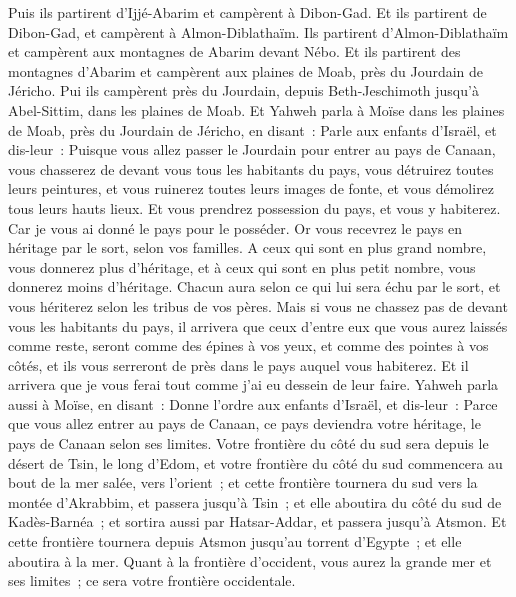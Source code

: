 \begin{multicols}{2}
Puis ils partirent d'Ijjé-Abarim et campèrent à Dibon-Gad.
Et ils partirent de Dibon-Gad, et campèrent à Almon-Diblathaïm.
Ils partirent d'Almon-Diblathaïm et campèrent aux montagnes de Abarim devant Nébo.
Et ils partirent des montagnes d'Abarim et campèrent aux plaines de Moab, près du Jourdain de Jéricho.
Pui ils campèrent près du Jourdain, depuis Beth-Jeschimoth jusqu'à Abel-Sittim, dans les plaines de Moab.
Et Yahweh parla à Moïse dans les plaines de Moab, près du Jourdain de Jéricho, en disant~:
Parle aux enfants d'Israël, et dis-leur~: Puisque vous allez passer le Jourdain pour entrer au pays de Canaan,
vous chasserez de devant vous tous les habitants du pays, vous détruirez toutes leurs peintures, et vous ruinerez toutes leurs images de fonte, et vous démolirez tous leurs hauts lieux.
Et vous prendrez possession du pays, et vous y habiterez. Car je vous ai donné le pays pour le posséder.
Or vous recevrez le pays en héritage par le sort, selon vos familles. A ceux qui sont en plus grand nombre, vous donnerez plus d'héritage, et à ceux qui sont en plus petit nombre, vous donnerez moins d'héritage. Chacun aura selon ce qui lui sera échu par le sort, et vous hériterez selon les tribus de vos pères.
Mais si vous ne chassez pas de devant vous les habitants du pays, il arrivera que ceux d'entre eux que vous aurez laissés comme reste, seront comme des épines à vos yeux, et comme des pointes à vos côtés, et ils vous serreront de près dans le pays auquel vous habiterez.
Et il arrivera que je vous ferai tout comme j'ai eu dessein de leur faire.
\VerseOne{}Yahweh parla aussi à Moïse, en disant~:
Donne l'ordre aux enfants d'Israël, et dis-leur~: Parce que vous allez entrer au pays de Canaan, ce pays deviendra votre héritage, le pays de Canaan selon ses limites.
Votre frontière du côté du sud sera depuis le désert de Tsin, le long d'Edom, et votre frontière du côté du sud commencera au bout de la mer salée, vers l'orient~;
et cette frontière tournera du sud vers la montée d'Akrabbim, et passera jusqu'à Tsin~; et elle aboutira du côté du sud de Kadès-Barnéa~; et sortira aussi par Hatsar-Addar, et passera jusqu'à Atsmon.
Et cette frontière tournera depuis Atsmon jusqu'au torrent d'Egypte~; et elle aboutira à la mer.
Quant à la frontière d'occident, vous aurez la grande mer et ses limites~; ce sera votre frontière occidentale.

\end{multicols}
